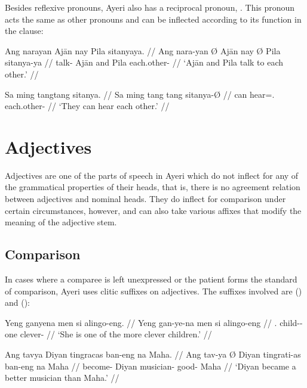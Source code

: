 Besides reflexive pronouns, Ayeri also has a reciprocal pronoun,
. This pronoun acts the same as other pronouns
and can be inflected according to its function in the clause:

\pex
\a\begingl
	\gla Ang narayan {} Ajān nay {} Pila sitanyaya. //
	\glb Ang nara-yan Ø Ajān nay Ø Pila sitanya-ya //
	\glc \AgtT{} talk-\TplM{} \Top{} Ajān and \Top{} Pila each.other-\Loc{} //
	\glft `Ajān and Pila talk to each other.' //
\endgl

\a\begingl
	\gla Sa ming tangtang sitanya. //
	\glb Sa ming tang tang sitanya-Ø //
	\glc \PatT{} can hear=\TplM{}.\Aarg{} each.other-\Top{} //
	\glft `They can hear each other.' //
\endgl

\xe



\section{Adjectives}
\label{sec:adjectives}

Adjectives are one of the parts of speech in Ayeri which do not inflect for any
of the grammatical properties of their heads, that is, there is no agreement
relation between adjectives and nominal heads. They do inflect for comparison
under certain circumstances, however, and can also take various affixes that
modify the meaning of the adjective stem.

\subsection{Comparison}
\label{subsec:adjcomp}

In cases where a comparee is left unexpressed or the patient forms the 
standard of comparison, Ayeri uses clitic suffixes on adjectives. The suffixes 
involved are  (\Comp{}) and  (\Supl{}):

\pex\label{ex:sfxcomp}
\a\label{ex:sfxcomp2}\begingl
	\gla Yeng ganyena men si alingo-eng. //
	\glb Yeng gan-ye-na men si alingo-eng //
	\glc \TsgF{}.\Aarg{} child-\Pl{}-\Gen{} one \Rel{} clever-\Comp{} //
	\glft `She is one of the more clever children.' //
\endgl

\a\label{ex:sfxcomp1}\begingl
	\gla Ang tavya {} Diyan tingracas ban-eng na Maha. //
	\glb Ang tav-ya Ø Diyan tingrati-as ban-eng na Maha //
	\glc \AgtT{} become-\TsgM{} \Top{} Diyan musician-\Parg{} good-\Comp{} 
		\Gen{} Maha //
	\glft `Diyan became a better musician than Maha.' //
\endgl

